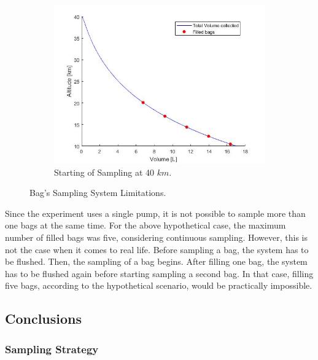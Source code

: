 \begin{figure}[H]
\begin{subfigure}{0.45\textwidth}
    \centering\includegraphics[width=1.2\textwidth]{appendix/img/samplevolume40km.png}
    \caption{Starting of Sampling at 40 $km$.}
  \end{subfigure}
  \caption{Bag's Sampling System Limitations.}\label{fig:limits}
\end{figure}
 

\bigskip
{}

\smallskip
Since the experiment uses a single pump, it is not possible to sample more than one bags at the same time. For the above hypothetical case, the maximum number of filled bags was five, considering continuous sampling. However, this is not the case when it comes to real life. Before sampling a bag, the system has to be flushed. Then, the sampling of a bag begins. After filling one bag, the system has to be flushed again before starting sampling a second bag. In that case, filling five bags, according to the hypothetical scenario, would be practically impossible.


\newpage
\subsection{Conclusions}

\subsubsection{Sampling Strategy}

